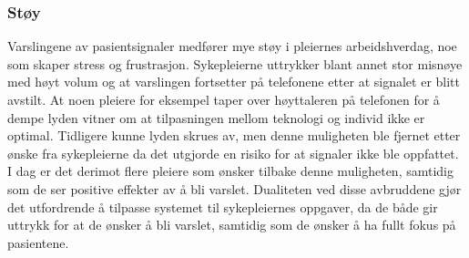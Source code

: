 \subsubsection{Støy}
Varslingene av pasientsignaler medfører mye støy i pleiernes arbeidshverdag, noe som skaper stress og frustrasjon. Sykepleierne uttrykker blant annet stor misnøye med høyt volum og at varslingen fortsetter på telefonene etter at signalet er blitt avstilt. At noen pleiere for eksempel taper over høyttaleren på telefonen for å dempe lyden vitner om at tilpasningen mellom teknologi og individ ikke er optimal. Tidligere kunne lyden skrues av, men denne muligheten ble fjernet etter ønske fra sykepleierne da det utgjorde en risiko for at signaler ikke ble oppfattet. I dag er det derimot flere pleiere som ønsker tilbake denne muligheten, samtidig som de ser positive effekter av å bli varslet. Dualiteten ved disse avbruddene gjør det utfordrende å tilpasse systemet til sykepleiernes oppgaver, da de både gir uttrykk for at de ønsker å bli varslet, samtidig som de ønsker å ha fullt fokus på pasientene. 

